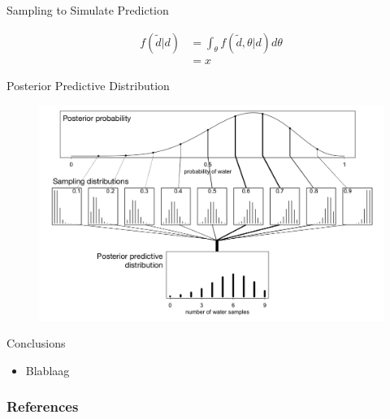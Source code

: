 \documentclass[handout]{beamer}
\begin{document}
\begin{frame}{Sampling to Simulate Prediction}
\scriptsize{

 \begin{eqnarray*}
 f(\tilde{d}|d) & = \int_{\theta}f(\tilde{d},\theta|d)d\theta \\ 
                & =  x
 \end{eqnarray*}






} 
\end{frame}



\begin{frame}{Posterior Predictive Distribution}

   \begin{figure}[h!]
	\centering
	\includegraphics[scale=0.31]{pics/posterior_predictive.png}
	\end{figure} 

\end{frame}


\begin{frame}{Conclusions}
\scriptsize{

\begin{itemize}
\item Blablaag
\end{itemize}


} 
\end{frame}


\begin{frame}[allowframebreaks]\scriptsize
\frametitle{References}


%
\end{frame}  









\end{document}
